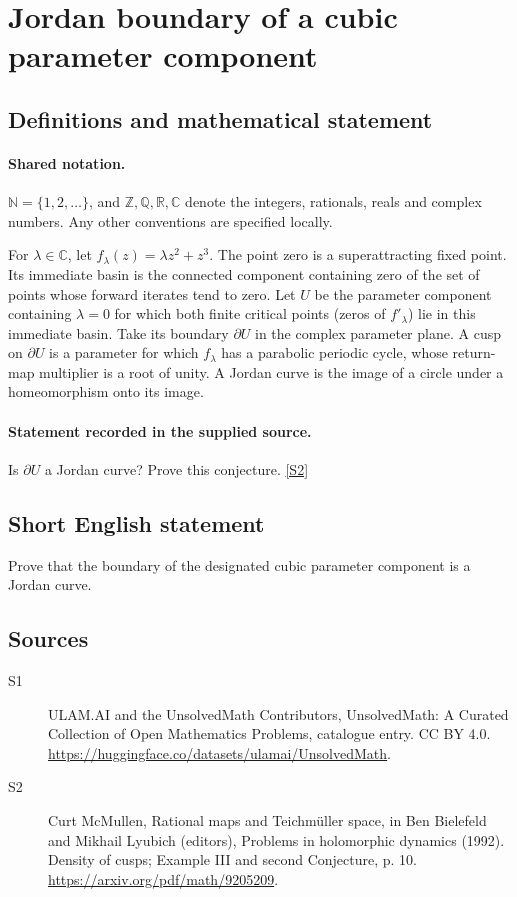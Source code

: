 \documentclass[11pt]{article}
\newcommand{\sref}[2]{\hyperlink{source:#1:#2}{[S#2]}}
\begin{document}
\section{Jordan boundary of a cubic parameter component}\label{statement}

\subsection{Definitions and mathematical statement}

\paragraph{Shared notation.}$\mathbb N=\{1,2,\ldots\}$, and $\mathbb Z,\mathbb Q,\mathbb R,\mathbb C$ denote the integers, rationals, reals and complex numbers. Any other conventions are specified locally.


For $\lambda\in\mathbb C$, let $f_\lambda(z)=\lambda z^2+z^3$. The point zero is a superattracting fixed point. Its immediate basin is the connected component containing zero of the set of points whose forward iterates tend to zero. Let $U$ be the parameter component containing $\lambda=0$ for which both finite critical points (zeros of $f'_\lambda$) lie in this immediate basin. Take its boundary $\partial U$ in the complex parameter plane. A cusp on $\partial U$ is a parameter for which $f_\lambda$ has a parabolic periodic cycle, whose return-map multiplier is a root of unity. A Jordan curve is the image of a circle under a homeomorphism onto its image.
\paragraph{Statement recorded in the supplied source.}
Is $\partial U$ a Jordan curve? Prove this conjecture. \sref{statement}{2}
\subsection{Short English statement}
Prove that the boundary of the designated cubic parameter component is a Jordan curve.
\subsection{Sources}
\begin{description}
\item[\hypertarget{source:statement:1}{S1}] ULAM.AI and the UnsolvedMath Contributors, UnsolvedMath: A Curated Collection of Open Mathematics Problems, catalogue entry. CC BY 4.0. \url{https://huggingface.co/datasets/ulamai/UnsolvedMath}.
\item[\hypertarget{source:statement:2}{S2}] Curt McMullen, Rational maps and Teichmüller space, in Ben Bielefeld and Mikhail Lyubich (editors), Problems in holomorphic dynamics (1992). Density of cusps; Example III and second Conjecture, p. 10. \url{https://arxiv.org/pdf/math/9205209}.
\end{description}
\label{end:statement}
\end{document}
